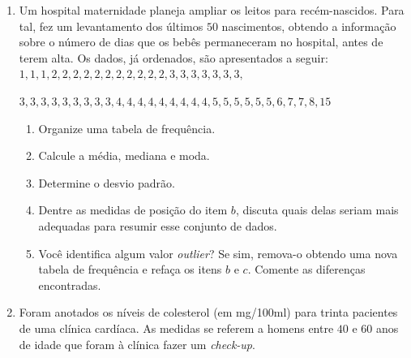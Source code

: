 \documentclass[oneside,a4paper,12pt]{article}
\begin{document}
\begin{enumerate}
	\item Um hospital maternidade planeja ampliar os leitos para recém-nascidos. Para tal, fez um levantamento dos últimos $50$ nascimentos, obtendo a informação sobre o número de dias que os bebês permaneceram no hospital, antes de terem alta. Os dados, já ordenados, são apresentados a seguir: $1,1,1,2,2,2,2,2,2,2,2,2,2,2,3,3,3,3,3,3,3,$
	
	 $3,3,3,3,3,3,3,3,3,4,4,4,4,4,4,4,4,4,5,5,5,5,5,5,6,7,7,8,15$
	\begin{enumerate}
		\item Organize uma tabela de frequência.
		\item Calcule a média, mediana e moda.
		\item Determine o desvio padrão.
		\item Dentre as medidas de posição do item $b$, discuta quais delas seriam mais adequadas para resumir esse conjunto de dados.
		\item Você identifica algum valor \emph{outlier}? Se sim, remova-o obtendo uma nova tabela de frequência e refaça os itens $b$ e $c$. Comente as diferenças encontradas.
	\end{enumerate}

	\item Foram anotados os níveis de colesterol (em mg/100ml) para trinta pacientes de uma clínica cardíaca. As medidas se referem a homens entre $40$ e $60$ anos de idade que foram à clínica fazer um \emph{check-up}.
	

\end{enumerate}
\end{document}
